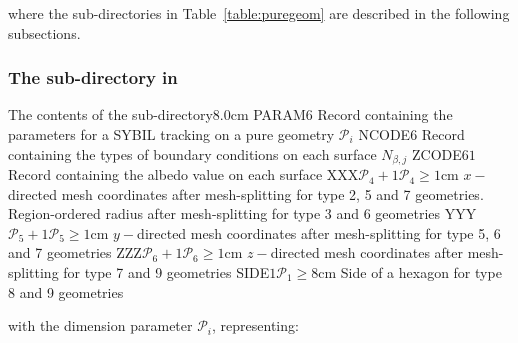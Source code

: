 \vskip -0.4cm
\noindent
where the sub-directories in Table~\ref{table:puregeom} are described in the following subsections.

\subsubsection{The  sub-directory in }\label{sect:puregeomtrackingdir}

\begin{DescriptionEnregistrement}{The contents of the 
 sub-directory}{8.0cm}
\IntEnr
  {PARAM}{$6$}
  {Record containing the parameters for a SYBIL tracking on a pure geometry $\mathcal{P}_{i}$}
\IntEnr
  {NCODE}{$6$}
  {Record containing the types of boundary conditions on each surface $N_{\beta,j}$}
\RealEnr
  {ZCODE}{$6$}{$1$}
  {Record containing the albedo value on each surface}
\OptRealEnr
  {XXX}{$\mathcal{P}_{4}+1$}{$\mathcal{P}_{4}\ge 1$}{cm}
  {$x-$directed mesh coordinates after mesh-splitting for type
   2, 5 and 7 geometries. Region-ordered radius after mesh-splitting for type 3 and 6
   geometries}
\OptRealEnr
  {YYY}{$\mathcal{P}_{5}+1$}{$\mathcal{P}_{5}\ge 1$}{cm}
  {$y-$directed mesh coordinates after mesh-splitting for type 5, 6 and 7 geometries}
\OptRealEnr
  {ZZZ}{$\mathcal{P}_{6}+1$}{$\mathcal{P}_{6}\ge 1$}{cm}
  {$z-$directed mesh coordinates after mesh-splitting for type 7 and 9 geometries}
\OptRealEnr
  {SIDE}{$1$}{$\mathcal{P}_{1}\ge 8$}{cm}
  {Side of a hexagon for type 8 and 9 geometries}
\end{DescriptionEnregistrement}

\vskip -0.2cm
\noindent
with the dimension parameter $\mathcal{P}_{i}$, representing:

